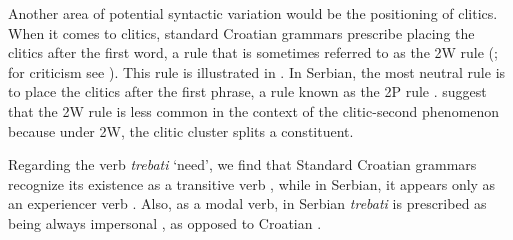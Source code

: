 \documentclass[output=paper,modfonts,newtxmath,hidelinks,]{langscibook}
\begin{document}
\ea \label{7:ex1}
	\z
\z

\noindent Another area of potential syntactic variation would be the positioning of clitics. When it comes to clitics, standard Croatian grammars prescribe placing the clitics after the first word, a rule that is sometimes referred to as the 2W rule (\citealt{Katicic}; for criticism see \citealt{Peti-Stantic2009}). This rule is illustrated in . In Serbian, the most neutral rule is to place the clitics after the first phrase, a rule known as the 2P rule . \citet{CorbettBrowne2009} suggest that the 2W rule is less common in the context of the clitic-second phenomenon because under 2W, the clitic cluster splits a constituent. 

\ea \label{7:ex2}
	\z
\z

\noindent Regarding the verb \textit{trebati} `need’, we find that Standard Croatian grammars recognize its existence as a transitive verb , while in Serbian, it appears only as an experiencer verb . Also, as a modal verb, in Serbian \textit{trebati} is prescribed as being always impersonal , as opposed to Croatian .

\ea \label{7:ex3}
	\z
\z
\end{document}
